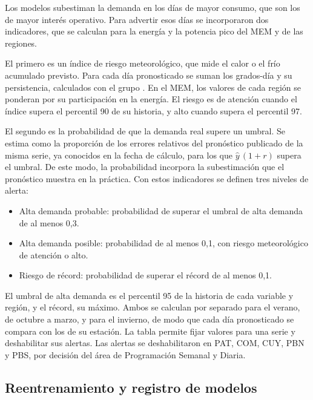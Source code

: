 Los modelos subestiman la demanda en los días de mayor consumo, que son los de mayor interés operativo. Para advertir esos días se incorporaron dos indicadores, que se calculan para la energía y la potencia pico del MEM y de las regiones.

El primero es un índice de riesgo meteorológico, que mide el calor o el frío acumulado previsto. Para cada día pronosticado se suman los grados-día y su persistencia, calculados con el grupo . En el MEM, los valores de cada región se ponderan por su participación en la energía. El riesgo es de atención cuando el índice supera el percentil 90 de su historia, y alto cuando supera el percentil 97.

El segundo es la probabilidad de que la demanda real supere un umbral. Se estima como la proporción de los errores relativos del pronóstico publicado de la misma serie, ya conocidos en la fecha de cálculo, para los que $\hat{y}\,(1 + r)$ supera el umbral. De este modo, la probabilidad incorpora la subestimación que el pronóstico muestra en la práctica. Con estos indicadores se definen tres niveles de alerta:

\begin{itemize}
	\item Alta demanda probable: probabilidad de superar el umbral de alta demanda de al menos 0,3.
	\item Alta demanda posible: probabilidad de al menos 0,1, con riesgo meteorológico de atención o alto.
	\item Riesgo de récord: probabilidad de superar el récord de al menos 0,1.
\end{itemize}

El umbral de alta demanda es el percentil 95 de la historia de cada variable y región, y el récord, su máximo. Ambos se calculan por separado para el verano, de octubre a marzo, y para el invierno, de modo que cada día pronosticado se compara con los de su estación. La tabla  permite fijar valores para una serie y deshabilitar sus alertas. Las alertas se deshabilitaron en PAT, COM, CUY, PBN y PBS, por decisión del área de Programación Semanal y Diaria.

\subsection{Reentrenamiento y registro de modelos}
\label{subsec:reentrenamiento}

